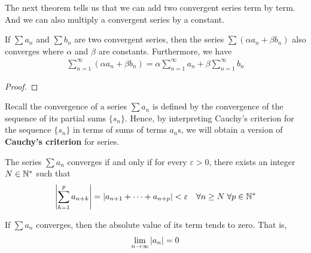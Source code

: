 \documentclass[thmcnt=section, 12pt]{my-elegantbook}
\begin{document}

The next theorem tells us that we can add two convergent series term by term. And we can also multiply a convergent series by a constant.

\begin{theorem} \label{thm:48}
    If $\sum a_n$ and $\sum b_n$ are two convergent series, then the series $\sum (\alpha a_n + \beta b_n)$ also converges where $\alpha$ and $\beta$ are constants. Furthermore, we have 
    \begin{align*}
        \sum_{n=1}^\infty (\alpha a_n + \beta b_n)
        = \alpha \sum_{n=1}^\infty a_n 
        + \beta \sum_{n=1}^\infty b_n
    \end{align*}
\end{theorem}

\begin{proof}
\end{proof}


Recall the convergence of a series $\sum a_n$ is defined by the convergence of the sequence of its partial sums $\{s_n\}$. Hence, by interpreting Cauchy's criterion for the sequence $\{s_n\}$ in terms of sums of terms $a_n$s, we will obtain a version of \textbf{Cauchy's criterion} for series.

\begin{theorem} \label{thm:53}
    The series $\sum a_n$ converges if and only if for every $\varepsilon > 0$, there exists an integer $N \in \mathbb{N}^\ast$ such that 
    \begin{align*}
        \left\lvert \sum_{k=1}^p a_{n+k} \right\rvert 
        = \left\lvert a_{n+1} + \cdots + a_{n+p} \right\rvert
        < \varepsilon
        \quad
        \forall n \geq N \; 
        \forall p \in \mathbb{N}^\ast
    \end{align*}
\end{theorem}

\begin{corollary} \label{cor:2}
    If $\sum a_n$ converges, then the absolute value of its term tends to zero. That is, 
    \begin{align*}
        \lim_{n \to \infty} \left\lvert a_n \right\rvert = 0
    \end{align*}
\end{corollary}

\end{document}
